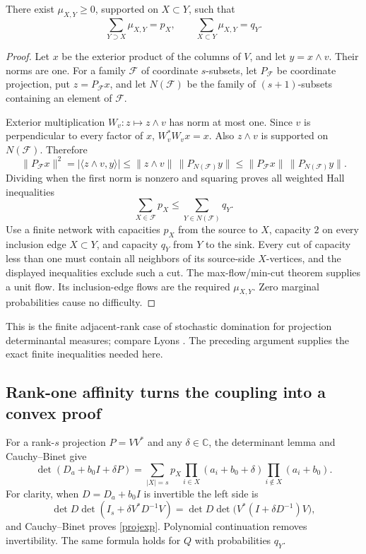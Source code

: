 \documentclass[11pt]{article}
\newcommand{\C}{\mathbb C}\newcommand{\R}{\mathbb R}\newcommand{\conv}{\operatorname{conv}}\newcommand{\diag}{\operatorname{diag}}\newcommand{\tr}{\operatorname{tr}}
\begin{document}
\begin{lemma}\label{couple}
There exist $\mu_{X,Y}\ge0$, supported on $X\subset Y$, such that
\[
\sum_{Y\supset X}\mu_{X,Y}=p_X,\qquad
\sum_{X\subset Y}\mu_{X,Y}=q_Y.
\]
\end{lemma}
\begin{proof}
Let $x$ be the exterior product of the columns of $V$, and let $y=x\wedge v$. Their norms are one. For a family $\mathcal F$ of coordinate $s$-subsets, let $P_{\mathcal F}$ be coordinate projection, put $z=P_{\mathcal F}x$, and let $N(\mathcal F)$ be the family of $(s+1)$-subsets containing an element of $\mathcal F$.

Exterior multiplication $W_v:z\mapsto z\wedge v$ has norm at most one. Since $v$ is perpendicular to every factor of $x$, $W_v^*W_vx=x$. Also $z\wedge v$ is supported on $N(\mathcal F)$. Therefore
\[
\|P_{\mathcal F}x\|^2
=|\langle z\wedge v,y\rangle|
\le \|z\wedge v\|\,\|P_{N(\mathcal F)}y\|
\le \|P_{\mathcal F}x\|\,\|P_{N(\mathcal F)}y\|.
\]
Dividing when the first norm is nonzero and squaring proves all weighted Hall inequalities
\[
\sum_{X\in\mathcal F}p_X\le\sum_{Y\in N(\mathcal F)}q_Y.
\]
Use a finite network with capacities $p_X$ from the source to $X$, capacity $2$ on every inclusion edge $X\subset Y$, and capacity $q_Y$ from $Y$ to the sink. Every cut of capacity less than one must contain all neighbors of its source-side $X$-vertices, and the displayed inequalities exclude such a cut. The max-flow/min-cut theorem supplies a unit flow. Its inclusion-edge flows are the required $\mu_{X,Y}$. Zero marginal probabilities cause no difficulty.
\end{proof}

This is the finite adjacent-rank case of stochastic domination for projection determinantal measures; compare Lyons \cite{lyons}. The preceding argument supplies the exact finite inequalities needed here.

\subsection{Rank-one affinity turns the coupling into a convex proof}
For a rank-$s$ projection $P=VV^*$ and any $\delta\in\C$, the determinant lemma and Cauchy--Binet give
\begin{equation}\label{projexp}
\det(D_a+b_0I+\delta P)
=\sum_{|X|=s}p_X\prod_{i\in X}(a_i+b_0+\delta)\prod_{i\notin X}(a_i+b_0).
\end{equation}
For clarity, when $D=D_a+b_0I$ is invertible the left side is
\[
\det D\det(I_s+\delta V^*D^{-1}V)
=\det D\det\bigl(V^*(I+\delta D^{-1})V\bigr),
\]
and Cauchy--Binet proves \eqref{projexp}. Polynomial continuation removes invertibility. The same formula holds for $Q$ with probabilities $q_Y$.
\end{document}
